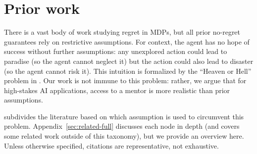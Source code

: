 \section{Prior work}
\label{sec:related}


There is a vast body of work studying regret in MDPs, but all prior no-regret guarantees rely on restrictive assumptions. For context, the agent has no hope of success without further assumptions: any unexplored action could lead to paradise (so the agent cannot neglect it) but the action could also lead to disaster (so the agent cannot risk it). This intuition is formalized by the ``Heaven or Hell'' problem in . Our work is not immune to this problem: rather, we argue that for high-stakes AI applications, access to a mentor is more realistic than prior assumptions.

 subdivides the literature based on which assumption is used to circumvent this problem. Appendix~\ref{sec:related-full} discusses each node in depth (and covers some related work outside of this taxonomy), but we provide an overview here. Unless otherwise specified, citations are representative, not exhaustive.








